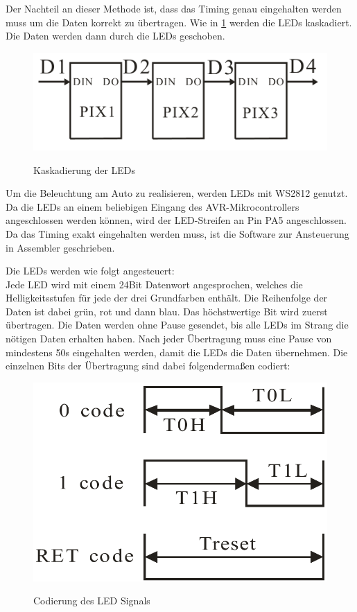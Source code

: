 Der Nachteil an dieser Methode ist, dass das Timing genau eingehalten werden muss um die Daten korrekt zu übertragen. Wie in \cref{fig:led_cascade} werden die 
LEDs kaskadiert. Die Daten werden dann durch die LEDs geschoben.

\begin{figure}[H]
\centering
\includegraphics[width=.8\textwidth]{led_cascade.png}\\
\caption{Kaskadierung der LEDs \cite{ds-WS2812}}%
\label{fig:led_cascade}
\end{figure}

Um die Beleuchtung am Auto zu realisieren, werden LEDs mit WS2812 genutzt. Da die LEDs an einem beliebigen
Eingang des AVR-Mikro\-con\-trol\-lers angeschlossen werden können, wird der LED-Streifen an Pin PA5 angeschlossen. Da das Timing 
exakt eingehalten werden muss, ist die Software zur Ansteuerung in Assembler geschrieben.

Die LEDs werden wie folgt angesteuert:\\
Jede LED wird mit einem 24Bit Datenwort angesprochen, welches die Helligkeitsstufen für jede der drei Grundfarben enthält. 
Die Reihenfolge der Daten ist dabei grün, rot und dann blau. Das höchstwertige Bit wird zuerst übertragen.
Die Daten werden ohne Pause gesendet, bis alle LEDs im Strang die nötigen Daten erhalten haben. Nach jeder Übertragung muss eine Pause von mindestens 50\textmu s eingehalten
werden, damit die LEDs die Daten übernehmen. Die einzelnen Bits der Übertragung sind dabei folgendermaßen codiert:

\begin{figure}[H]
\centering
\includegraphics[width=.5\textwidth]{led_timing.png}\\
\caption{Codierung des LED Signals \cite{ds-WS2812}}%
\label{fig:led_timing}
\end{figure}

